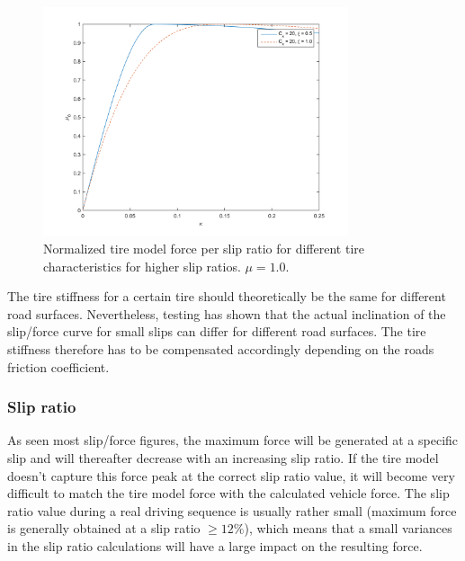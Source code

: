 \begin{figure}[h]
	\centering
	\includegraphics[width=0.8\textwidth]{Pictures/slipkraft_olika_xsi}
	\caption {Normalized tire model force per slip ratio for different tire characteristics for higher slip ratios.
		$ \mu = 1.0 $.}
	\label{different_xsi}
\end{figure}

The tire stiffness for a certain tire should theoretically be the same for different road surfaces. Nevertheless, testing has shown that the actual inclination of the slip/force curve for small slips can differ for different road surfaces. The tire stiffness therefore has to be compensated accordingly depending on the roads friction coefficient.

\subsubsection{Slip ratio}
As seen most slip/force figures, the maximum force will be generated at a specific slip and will thereafter decrease with an increasing slip ratio. If the tire model doesn't capture this force peak at the correct slip ratio value, it will become very difficult to match the tire model force with the calculated vehicle force. The slip ratio value during a real driving sequence is usually rather small (maximum force is generally obtained at a slip ratio $ \geq 12 \% $), which means that a small variances in the slip ratio calculations will have a large impact on the resulting force.

